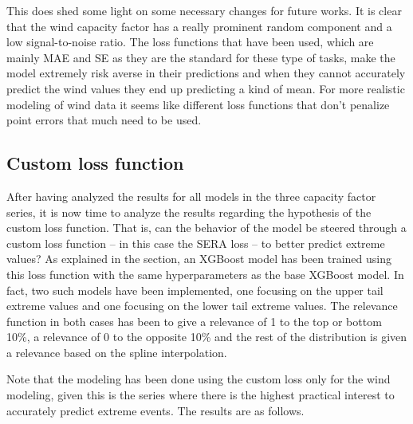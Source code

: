 This does shed some light on some necessary changes for future works. It is clear that the wind capacity factor has a really prominent random component and a low signal-to-noise ratio. The loss functions that have been used, which are mainly MAE and SE as they are the standard for these type of tasks, make the model extremely risk averse in their predictions and when they cannot accurately predict the wind values they end up predicting a kind of mean. For more realistic modeling of wind data it seems like different loss functions that don't penalize point errors that much need to be used. 

\subsection{Custom loss function}
After having analyzed the results for all models in the three capacity factor series, it is now time to analyze the results regarding the hypothesis of the custom loss function. That is, can the behavior of the model be steered through a custom loss function -- in this case the SERA loss -- to better predict extreme values? As explained in the  section, an XGBoost model has been trained using this loss function with the same hyperparameters as the base XGBoost model. In fact, two such models have been implemented, one focusing on the upper tail extreme values and one focusing on the lower tail extreme values. The relevance function in both cases has been to give a relevance of 1 to the top or bottom 10\%, a relevance of 0 to the opposite 10\% and the rest of the distribution is given a relevance based on the spline interpolation. 

Note that the modeling has been done using the custom loss only for the wind modeling, given this is the series where there is the highest practical interest to accurately predict extreme events. The results are as follows. 

